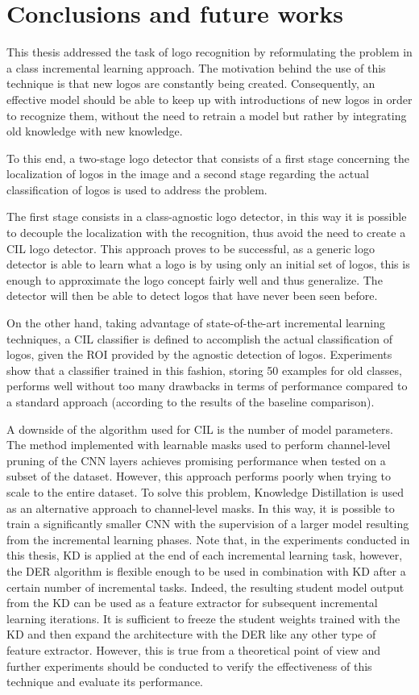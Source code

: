 \chapter{Conclusions and future works}
\label{chap:conclusions}

This thesis addressed the task of logo recognition by reformulating the problem in a class incremental learning approach.
The motivation behind the use of this technique is that new logos are constantly being created.
Consequently, an effective model should be able to keep up with introductions of new logos in order to recognize them, without the need to retrain a model but rather by integrating old knowledge with new knowledge.

To this end, a two-stage logo detector that consists of a first stage concerning the localization of logos in the image and a second stage regarding the actual classification of logos is used to address the problem.

The first stage consists in a class-agnostic logo detector, in this way it is possible to decouple the localization with the recognition, thus avoid the need to create a CIL logo detector. 
This approach proves to be successful, as a generic logo detector is able to learn what a logo is by using only an initial set of logos, this is enough to approximate the logo concept fairly well and thus generalize. The detector will then be able to detect logos that have never been seen before.

On the other hand, taking advantage of state-of-the-art incremental learning techniques, a CIL classifier is defined to accomplish the actual classification of logos, given the ROI provided by the agnostic detection of logos. Experiments show that a classifier trained in this fashion, storing 50 examples for old classes, performs well without too many drawbacks in terms of performance compared to a standard approach (according to the results of the baseline comparison).

A downside of the algorithm used for CIL is the number of model parameters.
The method implemented with learnable masks used to perform channel-level pruning of the CNN layers achieves promising performance when tested on a subset of the dataset. However, this approach performs poorly when trying to scale to the entire dataset. To solve this problem, Knowledge Distillation is used as an alternative approach to channel-level masks. In this way, it is possible to train a significantly smaller CNN with the supervision of a larger model resulting from the incremental learning phases. Note that, in the experiments conducted in this thesis, KD is applied at the end of each incremental learning task, however, the DER algorithm is flexible enough to be used in combination with KD after a certain number of incremental tasks.
Indeed, the resulting student model output from the KD can be used as a feature extractor for subsequent incremental learning iterations. It is sufficient to freeze the student weights trained with the KD and then expand the architecture with the DER like any other type of feature extractor.
However, this is true from a theoretical point of view and further experiments should be conducted to verify the effectiveness of this technique and evaluate its performance.

